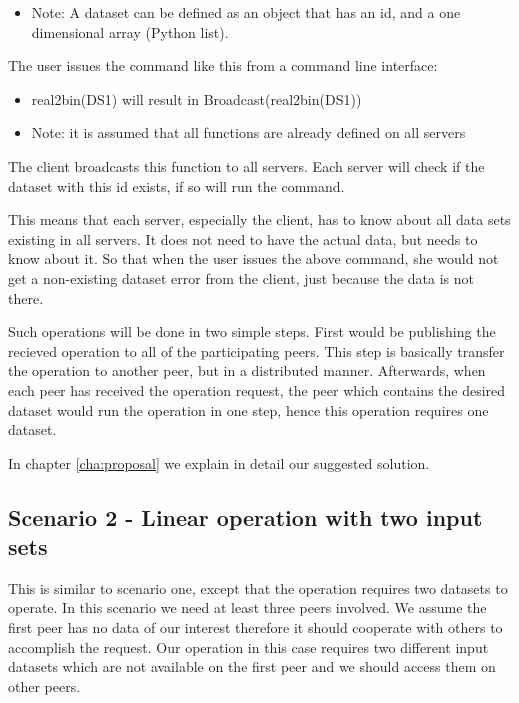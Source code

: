 \begin{itemize}
\item Note: A dataset can be defined as an object that has an id, and a one dimensional array (Python list).
\end{itemize}

The user issues the command like this from a command line interface: 

\begin{itemize}
\item real2bin(DS1) will result in  Broadcast(real2bin(DS1))
\item Note: it is assumed that all functions are already defined on all servers%
\end{itemize}

The client broadcasts this function to all servers. 
Each server will check if the dataset with this id exists, if so will run the command. 

This means that each server, especially the client, has to know about all data sets existing in all servers.
It does not need to have the actual data, but needs to know about it. 
So that when the user issues the above command,
she would not get a non-existing dataset error from the client, just because the data is not there. 

Such operations will be done in two simple steps. 
First would be publishing the recieved operation to all of the participating peers.
This step is basically transfer the operation to another peer, but in a distributed manner.
Afterwards, when each peer has received the operation request, 
the peer which contains the desired dataset would run the operation in one step,
hence this operation requires one dataset.

In chapter \ref{cha:proposal} we explain in detail our suggested solution.

\subsection{Scenario 2 - Linear operation with two input sets}
\label{sc:sc2}
This is similar to scenario one, except that the operation requires two datasets to operate. 
In this scenario we need at least three peers involved. We assume the first peer has no
data of our interest therefore it should cooperate with others to accomplish the request. 
Our operation in this case requires two 
different input datasets which are not available on the first peer and we should access them on other peers. 

